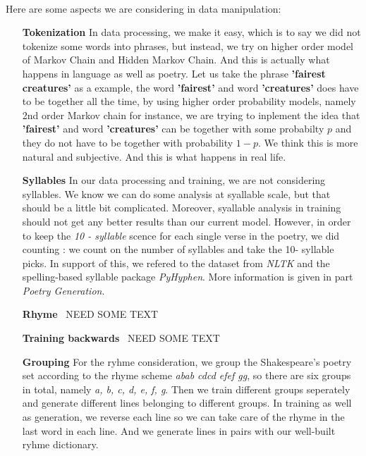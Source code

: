 %
\paragraph{}
Here are some aspects we are considering in data manipulation:
\begin{enumerate}
	\item [\textbf{Tokenization}] In data processing, we make it easy, which is to say we did not tokenize some words into phrases, but instead, we try on higher order model of Markov Chain and Hidden Markov Chain. And this is actually what happens in language as well as poetry. Let us take the phrase \textbf{'fairest creatures'} as a example, the word \textbf{'fairest'} and word \textbf{'creatures'} does have to be together all the time, by using higher order probability models, namely 2nd order Markov chain for instance, we are trying to inplement the idea that \textbf{'fairest'} and word \textbf{'creatures'} can be together with some probabilty $p$ and they do not have to be together with probability $1-p$. We think this is more natural and subjective. And this is what happens in real life.
	\item [\textbf{Syllables}] In our data processing and training, we are not considering syllables. We know we can do some analysis at syallable scale, but that should be a little bit complicated. Moreover, syallable analysis in training should not get any better results than our current model. However, in order to keep the \textit{10 - syllable} scence for each single verse in the poetry, we did counting : we count on the number of syllables and take the 10- syllable picks. In support of this, we refered to the dataset from \textit{NLTK} and the spelling-based syllable package \textit{PyHyphen}. More information is given in part \textit{Poetry Generation}.    
	\item [\textbf{Rhyme}]{\color{blue}\ NEED SOME TEXT}
	\item [\textbf{Training backwards}]{\color{blue}\ NEED SOME TEXT}
	\item [\textbf{Grouping}] For the ryhme consideration, we group the Shakespeare's poetry set according to the rhyme scheme \textit{abab cdcd efef gg}, so there are six groups in total, namely \textit{a, b, c, d, e, f, g}. Then we train different groups seperately and generate different lines belonging to different groups. In training as well as generation, we reverse each line so we can take care of the rhyme in the last word in each line. And we generate lines in pairs with our well-built ryhme dictionary.  
\end{enumerate}